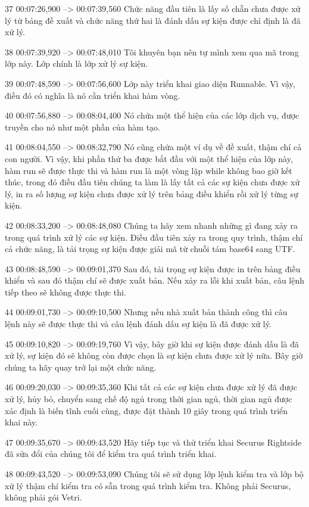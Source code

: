 37
00:07:26,900 --> 00:07:39,560
Chức năng đầu tiên là lấy số chẵn chưa được xử lý từ bảng đề xuất và chức năng thứ hai là đánh dấu sự kiện được chỉ định là đã xử lý.

38
00:07:39,920 --> 00:07:48,010
Tôi khuyên bạn nên tự mình xem qua mã trong lớp này.  Lớp chính là lớp xử lý sự kiện.

39
00:07:48,590 --> 00:07:56,600
Lớp này triển khai giao diện Runnable.  Vì vậy, điều đó có nghĩa là nó cần triển khai hàm vòng.

40
00:07:56,880 --> 00:08:04,400
Nó chứa một thể hiện của các lớp dịch vụ, được truyền cho nó như một phần của hàm tạo.

41
00:08:04,550 --> 00:08:32,790
Nó cũng chứa một ví dụ về đề xuất, thậm chí cả con người.  Vì vậy, khi phần thứ ba được bắt đầu với một thể hiện của lớp này, hàm run sẽ được thực thi và hàm run là một vòng lặp while không bao giờ kết thúc, trong đó điều đầu tiên chúng ta làm là lấy tất cả các sự kiện chưa được xử lý, in ra số lượng sự kiện chưa được xử lý  trên bảng điều khiển rồi xử lý từng sự kiện.

42
00:08:33,200 --> 00:08:48,080
Chúng ta hãy xem nhanh những gì đang xảy ra trong quá trình xử lý các sự kiện.  Điều đầu tiên xảy ra trong quy trình, thậm chí cả chức năng, là tải trọng sự kiện được giải mã từ chuỗi tám base64 sang UTF.

43
00:08:48,590 --> 00:09:01,370
Sau đó, tải trọng sự kiện được in trên bảng điều khiển và sau đó thậm chí sẽ được xuất bản.  Nếu xảy ra lỗi khi xuất bản, câu lệnh tiếp theo sẽ không được thực thi.

44
00:09:01,730 --> 00:09:10,500
Nhưng nếu nhà xuất bản thành công thì câu lệnh này sẽ được thực thi và câu lệnh đánh dấu sự kiện là đã được xử lý.

45
00:09:10,820 --> 00:09:19,760
Vì vậy, bây giờ khi sự kiện được đánh dấu là đã xử lý, sự kiện đó sẽ không còn được chọn là sự kiện chưa được xử lý nữa.  Bây giờ chúng ta hãy quay trở lại một chức năng.

46
00:09:20,030 --> 00:09:35,360
Khi tất cả các sự kiện chưa được xử lý đã được xử lý, hủy bỏ, chuyển sang chế độ ngủ trong thời gian ngủ, thời gian ngủ được xác định là biến tĩnh cuối cùng, được đặt thành 10 giây trong quá trình triển khai này.

47
00:09:35,670 --> 00:09:43,520
Hãy tiếp tục và thử triển khai Securus Rightside đã sửa đổi của chúng tôi để kiểm tra quá trình triển khai.

48
00:09:43,520 --> 00:09:53,090
Chúng tôi sẽ sử dụng lớp lệnh kiểm tra và lớp bộ xử lý thậm chí kiểm tra có sẵn trong quá trình kiểm tra.  Không phải Securus, không phải gói Vetri.

